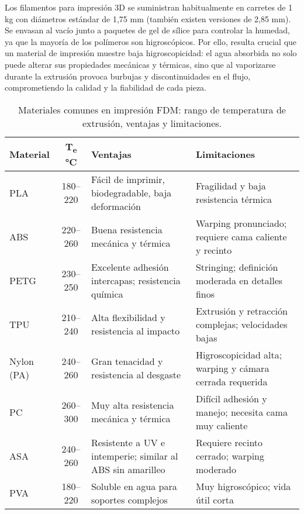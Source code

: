 Los filamentos para impresión 3D se suministran habitualmente en carretes de 1 kg con diámetros estándar de 1,75 mm (también existen versiones de 2,85 mm). Se envasan al vacío junto a paquetes de gel de sílice para controlar la humedad, ya que la mayoría de los polímeros son higroscópicos. Por ello, resulta crucial que un material de impresión muestre baja higroscopicidad: el agua absorbida no solo puede alterar sus propiedades mecánicas y térmicas, sino que al vaporizarse durante la extrusión provoca burbujas y discontinuidades en el flujo, comprometiendo la calidad y la fiabilidad de cada pieza.

\begin{table}[h]
  \centering
  \small
  \begin{tabular}{|l|c|p{5cm}|p{5cm}|}
    \hline
    \textbf{Material}    & \textbf{T\textsubscript{e} °C} & \textbf{Ventajas}                          & \textbf{Limitaciones}                             \\
    \hline
    PLA                  & 180–220                           & Fácil de imprimir, biodegradable, baja deformación              & Fragilidad y baja resistencia térmica               \\
    \hline
    ABS                  & 220–260                          & Buena resistencia mecánica y térmica                           & Warping pronunciado; requiere cama caliente y recinto     \\
    \hline
    PETG                 & 230–250                          & Excelente adhesión intercapas; resistencia química             & Stringing; definición moderada en detalles finos       \\
    \hline
    TPU                  & 210–240                         & Alta flexibilidad y resistencia al impacto                     & Extrusión y retracción complejas; velocidades bajas        \\
    \hline
    Nylon (PA)           & 240–260                        & Gran tenacidad y resistencia al desgaste                       & Higroscopicidad alta; warping y cámara cerrada requerida   \\
    \hline
    PC                   & 260–300                          & Muy alta resistencia mecánica y térmica                        & Difícil adhesión y manejo; necesita cama muy caliente      \\
    \hline
    ASA                  & 240–260                           & Resistente a UV e intemperie; similar al ABS sin amarilleo     & Requiere recinto cerrado; warping moderado                 \\
    \hline
    PVA        & 180–220                           & Soluble en agua para soportes complejos                       & Muy higroscópico; vida útil corta                          \\
    \hline
  \end{tabular}
  \caption{Materiales comunes en impresión FDM: rango de temperatura de extrusión, ventajas y limitaciones.}
  \label{tab:materiales_fdm}
\end{table}


